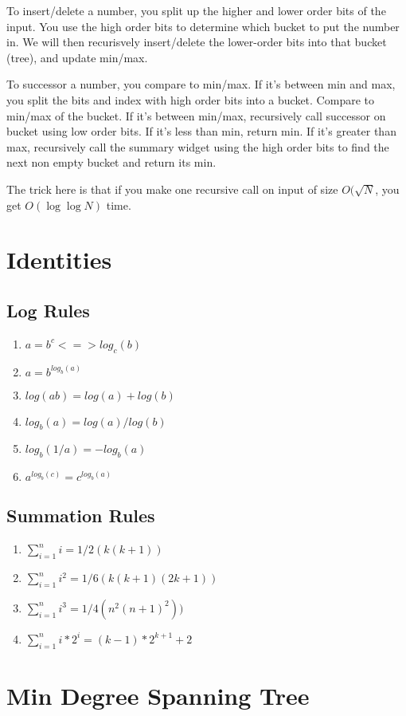 \documentclass[10pt,twocolumn]{article}
\begin{document}
To insert/delete a number, you split up the higher and lower order bits of the input. You use the high order bits to determine which bucket to put the number in. We will then recurisvely insert/delete the lower-order bits into that bucket (tree), and update min/max.

To successor a number, you compare to min/max. If it's between min and max, you split the bits and index with high order bits into a bucket. Compare to min/max of the bucket. If it's between min/max, recursively call successor on bucket using low order bits. If it's less than min, return min. If it's greater than max, recursively call the summary widget using the high order bits to find the next non empty bucket and return its min.

The trick here is that if you make one recursive call on input of size $O(\sqrt{N}$, you get $O(\log \log N)$ time.
\section{ Identities }
\subsection{ Log Rules }
\begin{enumerate}
    \item $a = b^c <=> log_c(b)$
    \item $a = b^{log_b(a)}$
    \item $log(a b) = log(a) + log(b)$
    \item $log_b(a) = log(a)/log(b)$
    \item $log_b(1/a) = -log_b(a)$
    \item $a^{log_b(c)} = c^{log_b(a)}$
    \end{enumerate}
\subsection{Summation Rules}
\begin{enumerate}
    \item $\sum_{i = 1}^n i = 1/2(k(k+1))$
    \item $\sum_{i = 1}^n i^2 = 1/6(k(k+1)(2k+1))$
    \item $\sum_{i = 1}^n i^3 = 1/4(n^2 (n+1)^2))$
    \item $\sum_{i = 1}^n i * 2^i = (k-1) * 2^{k+1} + 2$
\end{enumerate}

\section{ Min Degree Spanning Tree }
\end{document}
